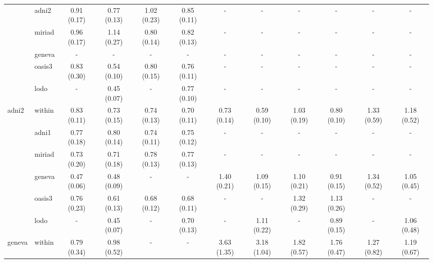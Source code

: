\begin{table*}
{\begin{tabular}{llcccccccccc}
\cmidrule(lr){2-12}
       & adni2 &  0.91 (0.17) &  0.77 (0.13) &  1.02 (0.23) &  0.85 (0.11) &            - &            - &            - &            - &            - &            - \\
       & miriad &  0.96 (0.17) &  1.14 (0.27) &  0.80 (0.14) &  0.82 (0.13) &            - &            - &            - &            - &            - &            - \\
       & geneva &            - &            - &            - &            - &            - &            - &            - &            - &            - &            - \\
       & oasis3 &  0.83 (0.30) &  0.54 (0.10) &  0.80 (0.15) &  0.76 (0.11) &            - &            - &            - &            - &            - &            - \\
\cmidrule(lr){2-12}
       & lodo &            - &  0.45 (0.07) &            - &  0.77 (0.10) &            - &            - &            - &            - &            - &            - \\
\midrule
adni2 & within &  0.83 (0.11) &  0.73 (0.15) &  0.74 (0.13) &  0.70 (0.11) &  0.73 (0.14) &  0.59 (0.10) &  1.03 (0.19) &  0.80 (0.10) &  1.33 (0.59) &  1.18 (0.52) \\
\cmidrule(lr){2-12}
       & adni1 &  0.77 (0.18) &  0.80 (0.14) &  0.74 (0.11) &  0.75 (0.12) &            - &            - &            - &            - &            - &            - \\
       & miriad &  0.73 (0.20) &  0.71 (0.18) &  0.78 (0.13) &  0.77 (0.13) &            - &            - &            - &            - &            - &            - \\
       & geneva &  0.47 (0.06) &  0.48 (0.09) &            - &            - &  1.40 (0.21) &  1.09 (0.15) &  1.10 (0.21) &  0.91 (0.15) &  1.34 (0.52) &  1.05 (0.45) \\
       & oasis3 &  0.76 (0.23) &  0.61 (0.13) &  0.68 (0.12) &  0.68 (0.11) &            - &            - &  1.32 (0.29) &  1.13 (0.26) &            - &            - \\
\cmidrule(lr){2-12}
       & lodo &            - &  0.45 (0.07) &            - &  0.70 (0.13) &            - &  1.11 (0.22) &            - &  0.89 (0.15) &            - &  1.06 (0.48) \\
\midrule
geneva & within &  0.79 (0.34) &  0.98 (0.52) &            - &            - &  3.63 (1.35) &  3.18 (1.04) &  1.82 (0.57) &  1.76 (0.47) &  1.27 (0.82) &  1.19 (0.67) \\
\cmidrule(lr){2-12}

\end{tabular}}
\end{table*}

